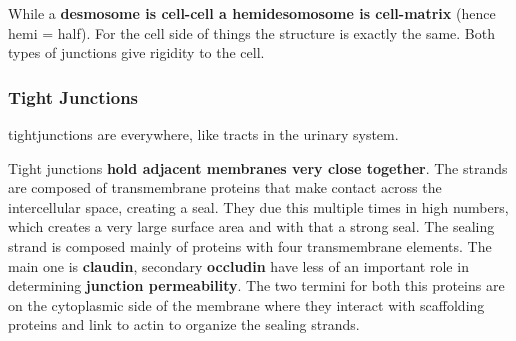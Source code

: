 \documentclass[../main.tex]{subfiles}
\begin{document}
\begin{figure}[H]
	\centering
	\caption{}
	\label{fig:desm}
\end{figure}

While a \textbf{desmosome is cell-cell a hemidesomosome is cell-matrix} (hence hemi = half). For the cell side of things the structure is exactly the same. Both types of junctions give rigidity to the cell.

\subsubsection{Tight Junctions}

\gls{tightjunctions} are everywhere, like tracts in the urinary system. 

Tight junctions \textbf{hold adjacent membranes very close together}. The strands are composed of transmembrane proteins that make contact across the intercellular space, creating a seal. They due this multiple times in high numbers, which creates a very large surface area and with that a strong seal. The sealing strand is composed mainly of proteins with four transmembrane elements. The main one is \textbf{\gls{claudin}}, secondary \textbf{\gls{occludin}} have less of an important role in determining \textbf{junction permeability}. The two termini for both this proteins are on the cytoplasmic side of the membrane where they interact with scaffolding proteins and link to actin to organize the sealing strands.
\end{document}
